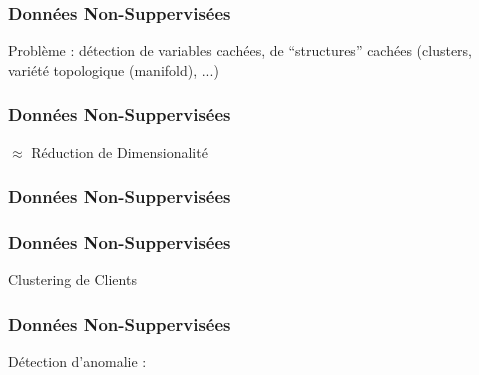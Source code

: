 \begin{frame}
  \frametitle{Données Non-Suppervisées}
  Problème : détection de variables cachées, de ``structures'' cachées (clusters, variété topologique (manifold), ...) \\ $\;$ \\
  \begin{minipage}[l]{0.69\linewidth}
  \end{minipage}\hfill
  \begin{minipage}[l]{0.29\linewidth}
  \end{minipage}\hfill
\end{frame}

\begin{frame}
  \frametitle{Données Non-Suppervisées}
  \begin{center}
    $\approx$ Réduction de Dimensionalité
  \end{center}
\end{frame}

\begin{frame}
  \frametitle{Données Non-Suppervisées}
  \begin{minipage}[l]{0.69\linewidth}
  \end{minipage}\hfill
  \begin{minipage}[l]{0.29\linewidth}
  \end{minipage}\hfill
\end{frame}

\begin{frame}
  \frametitle{Données Non-Suppervisées}
  Clustering de Clients
\end{frame}

\begin{frame}
  \frametitle{Données Non-Suppervisées}
  Détection d'anomalie :
\end{frame}
